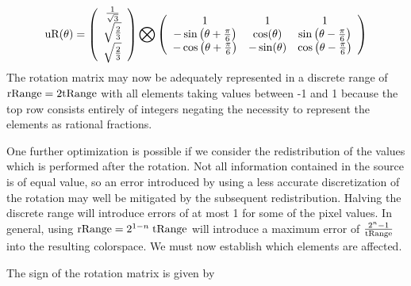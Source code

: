 \begin{equation}
\text{uR}(\theta) =
\left(
\begin{array}{c}
 \frac{1}{\sqrt{3}} \\
 \sqrt{\frac{2}{3}}  \\
 \sqrt{\frac{2}{3}} \\
\end{array}
\right) \bigotimes
\left(
\begin{array}{ccc}
 1 & 1 & 1 \\
 -\sin \left(\theta +\frac{\pi }{6}\right) &  \cos (\theta ) &  \sin \left(\theta -\frac{\pi }{6}\right) \\
 -\cos \left(\theta +\frac{\pi }{6}\right) & - \sin (\theta ) & \cos \left(\theta -\frac{\pi }{6}\right) \\
\end{array}
\right)
\end{equation}
The rotation matrix may now be adequately represented in a discrete range of $\text{rRange} = 2 \text{tRange}$ with all elements taking values between -1 and 1 because the top row consists entirely of integers negating the necessity to represent the elements as rational fractions.

One further optimization is possible if we consider the redistribution of the values which is performed after the rotation. Not all information contained in the source is of equal value, so an error introduced by using a less accurate discretization of the rotation may well be mitigated by the subsequent redistribution. Halving the discrete range will introduce errors of at most 1 for some of the pixel values. In general, using $\text{rRange} = 2^{1-n} \; \text{tRange}$ will introduce a maximum error of $\frac{2^n -1}{\text{tRange}}$ into the resulting colorspace. We must now establish which elements are affected.

The sign of the rotation matrix is given by

